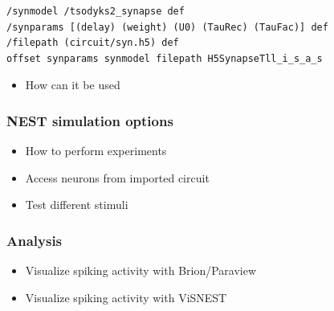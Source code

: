 \documentclass[a4paper]{article}
\begin{document}
\begin{lstlisting}[label=sliSynapses,caption=Example importing synapses]
/synmodel /tsodyks2_synapse def
/synparams [(delay) (weight) (U0) (TauRec) (TauFac)] def
/filepath (circuit/syn.h5) def
offset synparams synmodel filepath H5SynapseTll_i_s_a_s
\end{lstlisting}
\begin{itemize}
      \item How can it be used
\end{itemize}

\subsubsection{NEST simulation options}

\begin{itemize}
	  \item How to perform experiments
      \item Access neurons from imported circuit
      \item Test different stimuli 
\end{itemize}

\subsubsection{Analysis}
\begin{itemize}
	  \item Visualize spiking activity with Brion/Paraview
      \item Visualize spiking activity with ViSNEST
\end{itemize}

\newpage



\end{document}

